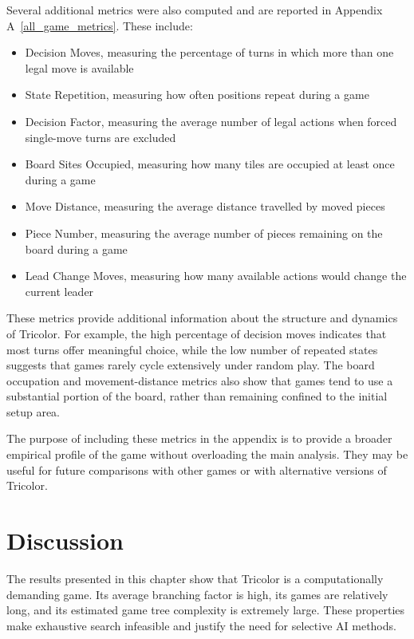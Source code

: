 Several additional metrics were also computed and are reported in Appendix A~\ref{all_game_metrics}. These include:

\begin{itemize}
    \item Decision Moves, measuring the percentage of turns in which more than one legal move is available
    \item State Repetition, measuring how often positions repeat during a game
    \item Decision Factor, measuring the average number of legal actions when forced single-move turns are excluded
    \item Board Sites Occupied, measuring how many tiles are occupied at least once during a game
    \item Move Distance, measuring the average distance travelled by moved pieces
    \item Piece Number, measuring the average number of pieces remaining on the board during a game
    \item Lead Change Moves, measuring how many available actions would change the current leader
\end{itemize}

These metrics provide additional information about the structure and dynamics of Tricolor. For example, the high percentage of decision moves indicates that most turns offer meaningful choice, while the low number of repeated states suggests that games rarely cycle extensively under random play. The board occupation and movement-distance metrics also show that games tend to use a substantial portion of the board, rather than remaining confined to the initial setup area.

The purpose of including these metrics in the appendix is to provide a broader empirical profile of the game without overloading the main analysis. They may be useful for future comparisons with other games or with alternative versions of Tricolor.

\section{Discussion}

The results presented in this chapter show that Tricolor is a computationally demanding game. Its average branching factor is high, its games are relatively long, and its estimated game tree complexity is extremely large. These properties make exhaustive search infeasible and justify the need for selective AI methods.

